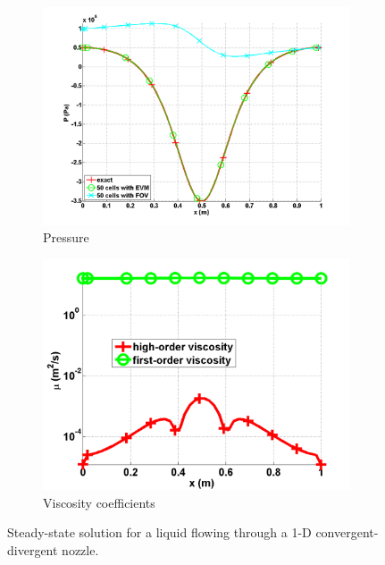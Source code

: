 \begin{figure}[H]
        \begin{subfigure}[b]{0.495\textwidth}
                \centering
                \includegraphics[width=\textwidth]{figures/liquid_pressure_numerical_and_exact_50.png}
                \caption{Pressure}
                \label{fig:1d_nozzle_liq_press}
        \end{subfigure}
        
        \begin{subfigure}[b]{0.495\textwidth}
                \centering
                \includegraphics[width=\textwidth]{figures/liquid_viscosity_numerical50.png}
                \caption{Viscosity coefficients}
                \label{fig:1d_nozzle_liq_visc}
        \end{subfigure}
        \caption{Steady-state solution for a liquid flowing through a 1-D convergent-divergent nozzle.}\label{fig:1d_liq_nozzle}
\end{figure}
